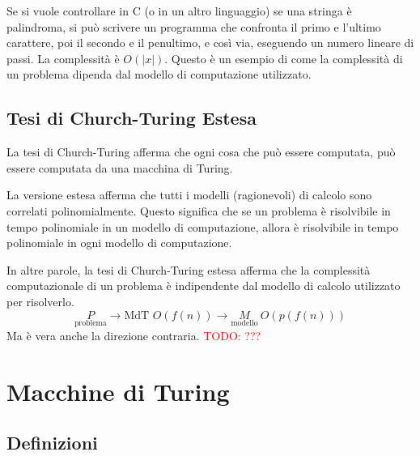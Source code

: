 Se si vuole controllare in C (o in un altro linguaggio) se una stringa è palindroma, si può scrivere un programma che confronta il primo e l'ultimo carattere, poi il secondo e il penultimo, e così via, eseguendo un numero lineare di passi. La complessità è $O(|x|)$. Questo è un esempio di come la complessità di un problema dipenda dal modello di computazione utilizzato.


\section{Tesi di Church-Turing Estesa} La tesi di Church-Turing afferma che ogni cosa che può essere computata, può essere computata da una macchina di Turing.

La versione estesa afferma che tutti i modelli (ragionevoli) di calcolo sono correlati polinomialmente. Questo significa che se un problema è risolvibile in tempo polinomiale in un modello di computazione, allora è risolvibile in tempo polinomiale in ogni modello di computazione.

In altre parole, la tesi di Church-Turing estesa afferma che la complessità computazionale di un problema è indipendente dal modello di calcolo utilizzato per risolverlo.
$$
    \underset{\text{problema}}{P} \to \text{MdT }O(f(n)) \to \underset{\text{modello}}{M}~O(p(f(n)))  
$$
Ma è vera anche la direzione contraria. \textcolor{Red}{TODO: ???}




\chapter{Macchine di Turing}


\section{Definizioni}

